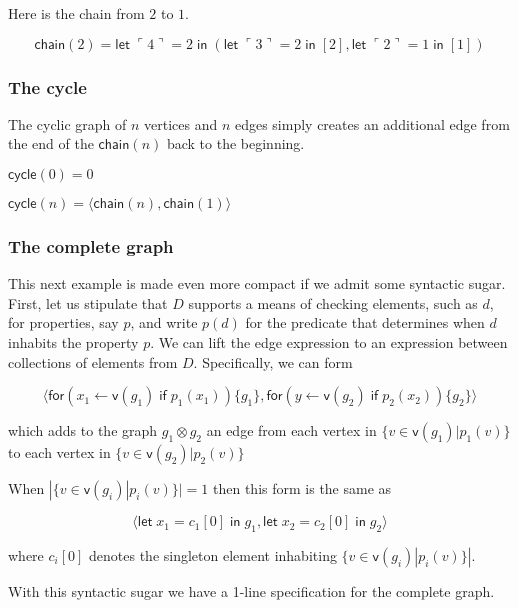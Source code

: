 \documentclass[12pt]{llncs}
\begin{document}
Here is the chain from \(2\) to \(1\).

\[\mathsf{chain}(2) = \mathsf{let}\; \ulcorner 4 \urcorner = 2 \; \mathsf{in}\; (\mathsf{let}\; \ulcorner 3 \urcorner = 2 \; \mathsf{in}\; [2], \mathsf{let}\; \ulcorner 2\urcorner = 1 \; \mathsf{in}\; [1])\]

\hypertarget{the-cycle}{%
\subsubsection{The cycle}\label{the-cycle}}

The cyclic graph of \(n\) vertices and \(n\) edges simply creates an
additional edge from the end of the \(\mathsf{chain}(n)\) back to the
beginning.

\(\mathsf{cycle}(0) = 0\)

\(\mathsf{cycle}(n) = \langle \mathsf{chain}(n), \mathsf{chain}(1) \rangle\)

\hypertarget{the-complete-graph}{%
\subsubsection{The complete graph}\label{the-complete-graph}}

This next example is made even more compact if we admit some syntactic
sugar. First, let us stipulate that \(D\) supports a means of checking
elements, such as \(d\), for properties, say \(p\), and write \(p(d)\)
for the predicate that determines when \(d\) inhabits the property
\(p\). We can lift the edge expression to an expression between
collections of elements from \(D\). Specifically, we can form

\[\langle \mathsf{for} ( x_1 \leftarrow \mathsf{v}(g_1)\; \mathsf{if}\; p_1(x_1) )\{ g_1 \}, \mathsf{for} ( y \leftarrow \mathsf{v}(g_2)\; \mathsf{if}\; p_2(x_2) )\{ g_2 \} \rangle\]

which adds to the graph \(g_1 \otimes g_2\) an edge from each vertex in
\(\{ v \in \mathsf{v}(g_1) | p_1(v) \}\) to each vertex in
\(\{ v \in \mathsf{v}(g_2) | p_2(v) \}\)

When \(|\{ v \in \mathsf{v}(g_i) | p_i(v) \}| = 1\) then this form is
the same as

\[\langle \mathsf{let}\; x_1 = c_1[0] \; \mathsf{in}\; g_1 , \mathsf{let}\; x_2 = c_2[0] \; \mathsf{in}\; g_2 \rangle\]

where \(c_i[0]\) denotes the singleton element inhabiting
\(\{ v \in \mathsf{v}(g_i) | p_i(v) \}|\).

With this syntactic sugar we have a 1-line specification for the
complete graph.
\end{document}
